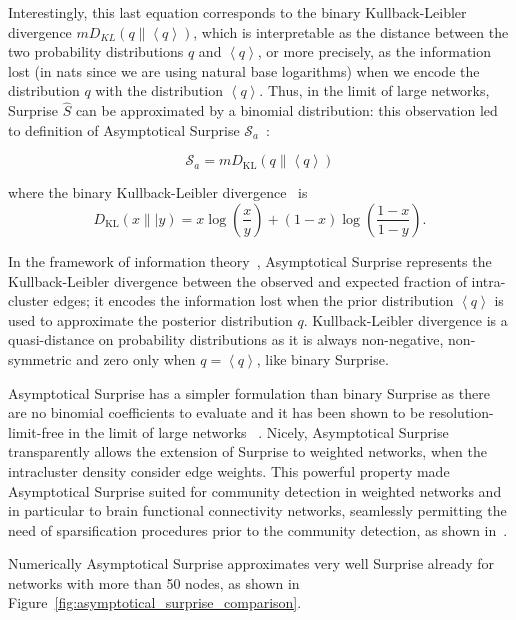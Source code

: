 Interestingly, this last equation corresponds to the binary Kullback-Leibler divergence $m D_{KL}(q \| \left< q \right>)$, which is interpretable as the distance between the two probability distributions $q$ and $\left<q\right>$, or more precisely, as the information lost (in nats since we are using natural base logarithms) when we encode the distribution $q$ with the distribution $\left< q\right>$. 
Thus, in the limit of large networks, Surprise $\hat{S}$ can be approximated by a binomial distribution: this observation led to definition of Asymptotical Surprise $\mathcal{S}_a$~\cite{traag2015}:

\begin{equation}\label{eq:asymptoticalsurprise}
\mathcal{S}_a = m D_{\textrm{KL}}\left( q \| \left< q \right> \right)
\end{equation}

where the binary Kullback-Leibler divergence~\cite{kullback1951} is $$D_{\textrm{KL}}(x\|| y) = x \log \left(\frac{x}{y} \right) + (1-x)\log \left (\frac{1-x}{1-y} \right).$$

In the framework of information theory~\cite{cover2006}, Asymptotical Surprise represents the Kullback-Leibler divergence between the observed and expected fraction of intra-cluster edges; it encodes the information lost when the prior distribution $\left <q \right >$ is used to approximate the posterior distribution $q$. Kullback-Leibler divergence is a quasi-distance on probability distributions as it is always non-negative, non-symmetric and zero only when $q=\left< q \right>$, like binary Surprise.

Asymptotical Surprise has a simpler formulation than binary Surprise as there are no binomial coefficients to evaluate and it has been shown to be resolution-limit-free in the limit of large networks ~\cite{traag2015}. Nicely, Asymptotical Surprise transparently allows the extension of Surprise to weighted networks, when the intracluster density consider edge weights. This powerful property made Asymptotical Surprise suited for community detection in weighted networks and in particular to brain functional connectivity networks, seamlessly permitting the need of sparsification procedures prior to the community detection, as shown in~\cite{nicolini2017}.

Numerically Asymptotical Surprise approximates very well Surprise already for networks with more than 50 nodes, as shown in Figure~\ref{fig:asymptotical_surprise_comparison}.


